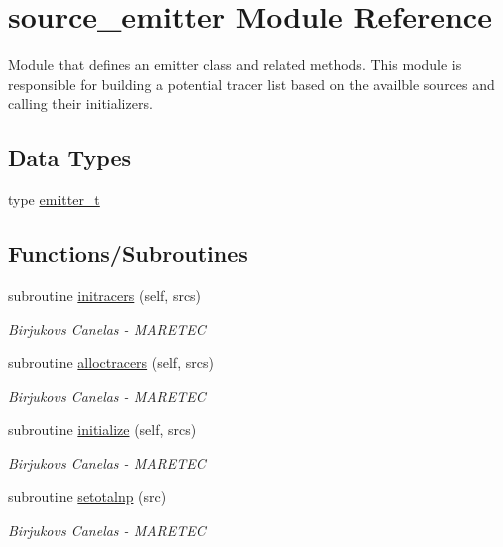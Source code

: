 \hypertarget{namespacesource__emitter}{}\section{source\+\_\+emitter Module Reference}
\label{namespacesource__emitter}


Module that defines an emitter class and related methods. This module is responsible for building a potential tracer list based on the availble sources and calling their initializers.  


\subsection*{Data Types}
\begin{DoxyCompactItemize}
\item 
type \hyperlink{structsource__emitter_1_1emitter__t}{emitter\+\_\+t}
\end{DoxyCompactItemize}
\subsection*{Functions/\+Subroutines}
\begin{DoxyCompactItemize}
\item 
subroutine \hyperlink{namespacesource__emitter_a2fb64d19c0016b31bd9dab0a13785d61}{initracers} (self, srcs)
\begin{DoxyCompactList}\small\item\em Birjukovs Canelas -\/ M\+A\+R\+E\+T\+EC \end{DoxyCompactList}\item 
subroutine \hyperlink{namespacesource__emitter_a54e88b7aa868ff9de8cf018208a20585}{alloctracers} (self, srcs)
\begin{DoxyCompactList}\small\item\em Birjukovs Canelas -\/ M\+A\+R\+E\+T\+EC \end{DoxyCompactList}\item 
subroutine \hyperlink{namespacesource__emitter_a6400b97541c15fcf0ec523b359aacac9}{initialize} (self, srcs)
\begin{DoxyCompactList}\small\item\em Birjukovs Canelas -\/ M\+A\+R\+E\+T\+EC \end{DoxyCompactList}\item 
subroutine \hyperlink{namespacesource__emitter_a73d054a39fc1fccfde74173a5c7f2c58}{setotalnp} (src)
\begin{DoxyCompactList}\small\item\em Birjukovs Canelas -\/ M\+A\+R\+E\+T\+EC \end{DoxyCompactList}\end{DoxyCompactItemize}
